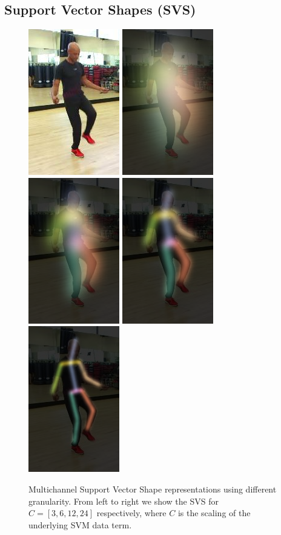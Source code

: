 \subsection{Support Vector Shapes (SVS)}
\label{sec:svs}
\label{sec:signals}

\begin{figure}[b!]
\begin{center}
   \includegraphics[width=0.18\linewidth]{resources/Human_Poses/svs-orig}
   \includegraphics[width=0.18\linewidth]{resources/Human_Poses/svs-0}
   \includegraphics[width=0.18\linewidth]{resources/Human_Poses/svs-1}
   \includegraphics[width=0.18\linewidth]{resources/Human_Poses/svs-2}
   \includegraphics[width=0.18\linewidth]{resources/Human_Poses/svs-3}
\end{center}
\caption{Multichannel Support Vector Shape representations using different granularity. From left to right we show the SVS for $C=[3, 6, 12, 24]$ respectively, where $C$ is the scaling of the underlying SVM data term.}
\label{fig:svs}
\end{figure}

